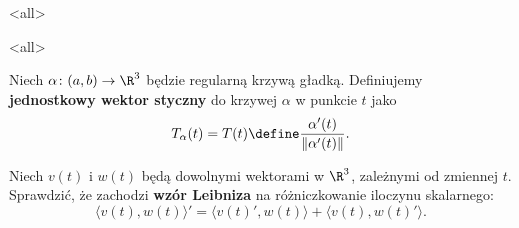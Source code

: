 \mode*
\mode<all>{}

\mode<all>{}
\begin{frame}[<+->]
\begin{definicja}
Niech $\alpha\colon (a,b)\to \R^3$ będzie regularną krzywą gładką. Definiujemy 
\textbf{jednostkowy wektor styczny} do krzywej $\alpha$ w punkcie $t$ jako 
\[T_\alpha(t)=T(t)\define\frac{\alpha'(t)}{\|\alpha'(t)\|}.\]
\end{definicja}

\begin{center}
\begin{tikzpicture}[y=0.80pt, x=0.8pt,scale=0.5,yscale=-1, inner sep=0pt, outer sep=0pt]

\end{tikzpicture}
\end{center}

\end{frame}
\begin{frame}
 \begin{exercise}
  Niech $v(t)$ i $w(t)$ będą dowolnymi wektorami w $\R^3$, zależnymi od zmiennej $t$. Sprawdzić, że zachodzi \textbf{wz\'or Leibniza} na r\'ożniczkowanie iloczynu skalarnego:
\[\langle v(t),w(t) \rangle'=\langle v(t)',w(t) \rangle+\langle v(t),w(t)' \rangle.\]
 \end{exercise}

\end{frame}


